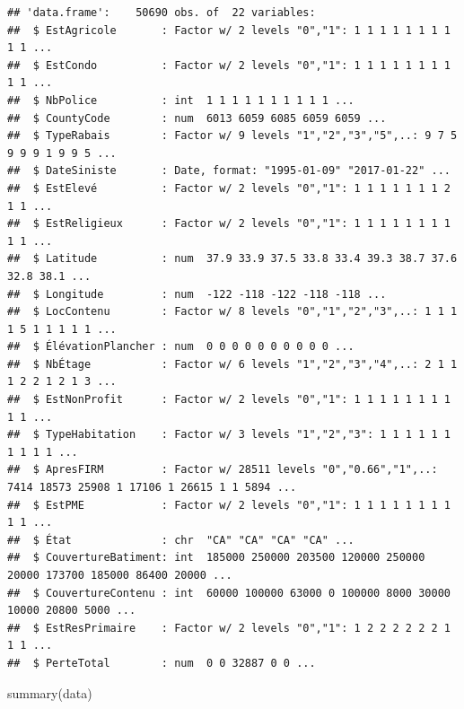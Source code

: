 \documentclass[
]{article}
\newenvironment{Shaded}{\begin{snugshade}}{\end{snugshade}}
\newcommand{\FunctionTok}[1]{\textcolor[rgb]{0.00,0.00,0.00}{#1}}
\newcommand{\NormalTok}[1]{#1}
\begin{document}
\begin{verbatim}
## 'data.frame':    50690 obs. of  22 variables:
##  $ EstAgricole       : Factor w/ 2 levels "0","1": 1 1 1 1 1 1 1 1 1 1 ...
##  $ EstCondo          : Factor w/ 2 levels "0","1": 1 1 1 1 1 1 1 1 1 1 ...
##  $ NbPolice          : int  1 1 1 1 1 1 1 1 1 1 ...
##  $ CountyCode        : num  6013 6059 6085 6059 6059 ...
##  $ TypeRabais        : Factor w/ 9 levels "1","2","3","5",..: 9 7 5 9 9 9 1 9 9 5 ...
##  $ DateSiniste       : Date, format: "1995-01-09" "2017-01-22" ...
##  $ EstElevé          : Factor w/ 2 levels "0","1": 1 1 1 1 1 1 1 2 1 1 ...
##  $ EstReligieux      : Factor w/ 2 levels "0","1": 1 1 1 1 1 1 1 1 1 1 ...
##  $ Latitude          : num  37.9 33.9 37.5 33.8 33.4 39.3 38.7 37.6 32.8 38.1 ...
##  $ Longitude         : num  -122 -118 -122 -118 -118 ...
##  $ LocContenu        : Factor w/ 8 levels "0","1","2","3",..: 1 1 1 1 5 1 1 1 1 1 ...
##  $ ÉlévationPlancher : num  0 0 0 0 0 0 0 0 0 0 ...
##  $ NbÉtage           : Factor w/ 6 levels "1","2","3","4",..: 2 1 1 1 2 2 1 2 1 3 ...
##  $ EstNonProfit      : Factor w/ 2 levels "0","1": 1 1 1 1 1 1 1 1 1 1 ...
##  $ TypeHabitation    : Factor w/ 3 levels "1","2","3": 1 1 1 1 1 1 1 1 1 1 ...
##  $ ApresFIRM         : Factor w/ 28511 levels "0","0.66","1",..: 7414 18573 25908 1 17106 1 26615 1 1 5894 ...
##  $ EstPME            : Factor w/ 2 levels "0","1": 1 1 1 1 1 1 1 1 1 1 ...
##  $ État              : chr  "CA" "CA" "CA" "CA" ...
##  $ CouvertureBatiment: int  185000 250000 203500 120000 250000 20000 173700 185000 86400 20000 ...
##  $ CouvertureContenu : int  60000 100000 63000 0 100000 8000 30000 10000 20800 5000 ...
##  $ EstResPrimaire    : Factor w/ 2 levels "0","1": 1 2 2 2 2 2 2 1 1 1 ...
##  $ PerteTotal        : num  0 0 32887 0 0 ...
\end{verbatim}

\begin{Shaded}
\begin{Highlighting}[]
\FunctionTok{summary}\NormalTok{(data)}
\end{Highlighting}
\end{Shaded}
\end{document}

